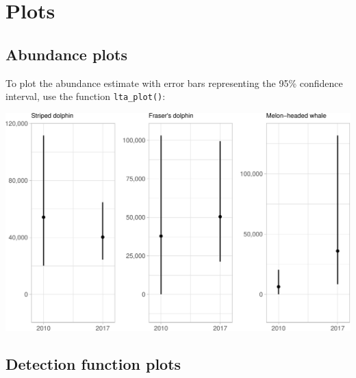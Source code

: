 \documentclass[
]{book}
\newenvironment{Shaded}{\begin{snugshade}}{\end{snugshade}}
\newcommand{\DataTypeTok}[1]{\textcolor[rgb]{0.13,0.29,0.53}{#1}}
\newcommand{\DecValTok}[1]{\textcolor[rgb]{0.00,0.00,0.81}{#1}}
\newcommand{\KeywordTok}[1]{\textcolor[rgb]{0.13,0.29,0.53}{\textbf{#1}}}
\newcommand{\NormalTok}[1]{#1}
\newcommand{\OperatorTok}[1]{\textcolor[rgb]{0.81,0.36,0.00}{\textbf{#1}}}
\newcommand{\StringTok}[1]{\textcolor[rgb]{0.31,0.60,0.02}{#1}}
\begin{document}
\hypertarget{plots}{%
\section*{Plots}\label{plots}}

\hypertarget{abundance-plots}{%
\subsection*{Abundance plots}\label{abundance-plots}}

To plot the abundance estimate with error bars representing the 95\% confidence interval, use the function \texttt{lta\_plot()}:

\begin{Shaded}
\end{Shaded}

\includegraphics{figures/unnamed-chunk-258-1.pdf}

\hypertarget{detection-function-plots}{%
\subsection*{Detection function plots}\label{detection-function-plots}}
\end{document}
